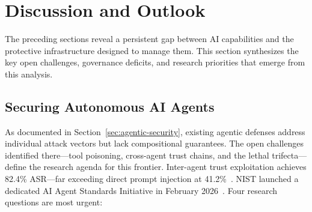 
\section{Discussion and Outlook}
\label{sec:discussion}

The preceding sections reveal a persistent gap between AI capabilities and the protective infrastructure designed to manage them. This section synthesizes the key open challenges, governance deficits, and research priorities that emerge from this analysis.


\subsection{Securing Autonomous AI Agents}
\label{sec:future-agents}


As documented in Section~\ref{sec:agentic-security}, existing agentic defenses address individual attack vectors but lack compositional guarantees. The open challenges identified there---tool poisoning, cross-agent trust chains, and the lethal trifecta---define the research agenda for this frontier. Inter-agent trust exploitation achieves 82.4\% ASR---far exceeding direct prompt injection at 41.2\%~\cite{darkside2025agents}. NIST launched a dedicated AI Agent Standards Initiative in February 2026~\cite{nist2026agentstandards}. Four research questions are most urgent:

